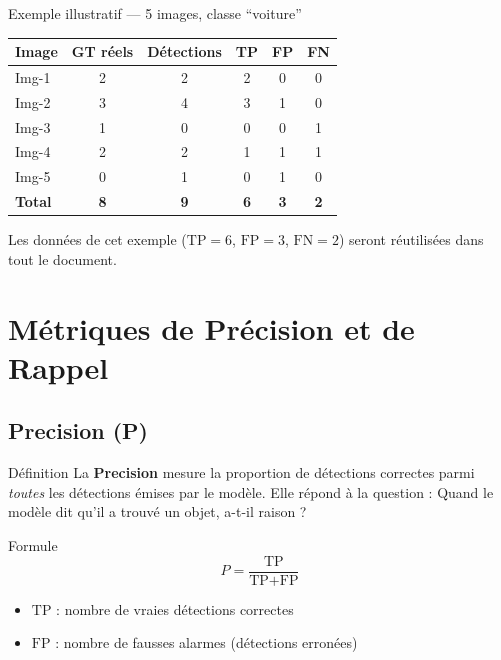 \documentclass[12pt, a4paper]{report}
\newcommand{\tp}{\text{TP}}
\newcommand{\fp}{\text{FP}}
\newcommand{\fn}{\text{FN}}
\begin{document}
\begin{examplebox}{Exemple illustratif — 5 images, classe ``voiture''}
  \begin{center}
  \begin{tabular}{lccccc}
    \toprule
    \textbf{Image} & \textbf{GT réels} & \textbf{Détections} & \textbf{TP} & \textbf{FP} & \textbf{FN} \\
    \midrule
    Img-1 & 2 & 2 & 2 & 0 & 0 \\
    Img-2 & 3 & 4 & 3 & 1 & 0 \\
    Img-3 & 1 & 0 & 0 & 0 & 1 \\
    Img-4 & 2 & 2 & 1 & 1 & 1 \\
    Img-5 & 0 & 1 & 0 & 1 & 0 \\
    \midrule
    \textbf{Total} & \textbf{8} & \textbf{9} & \textbf{6} & \textbf{3} & \textbf{2} \\
    \bottomrule
  \end{tabular}
  \end{center}
\end{examplebox}

Les données de cet exemple ($\tp=6$, $\fp=3$, $\fn=2$) seront réutilisées dans
tout le document.

\chapter{Métriques de Précision et de Rappel}

\section{Precision (P)}

\begin{definitionbox}{Définition}
  La \textbf{Precision} mesure la proportion de détections correctes parmi
  \emph{toutes} les détections émises par le modèle. Elle répond à la question :
  \og Quand le modèle dit qu'il a trouvé un objet, a-t-il raison ? \fg
\end{definitionbox}

\begin{formulebox}{Formule}
  \[
    P = \frac{\tp}{\tp + \fp}
  \]
  \begin{itemize}
    \item $\tp$ : nombre de vraies détections correctes
    \item $\fp$ : nombre de fausses alarmes (détections erronées)
  \end{itemize}
\end{formulebox}
\end{document}
